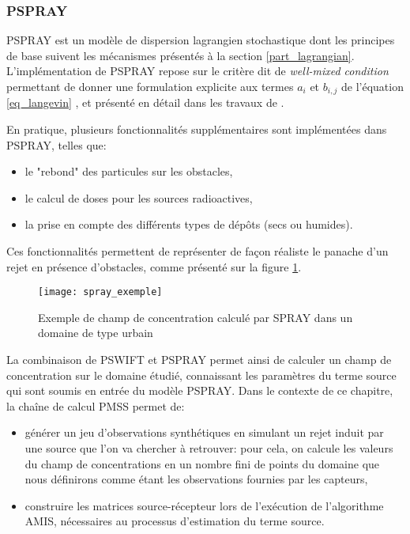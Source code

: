 {
\subsubsection{PSPRAY}
}

{PSPRAY} est un modèle de dispersion lagrangien stochastique dont les principes de base suivent les mécanismes présentés à la section \ref{part_lagrangian}. L'implémentation de {PSPRAY} repose sur le critère dit de \textit{well-mixed condition} permettant de donner une formulation explicite aux termes $a_i$ et $b_{i,j}$ de l'équation \eqref{eq_langevin} , et présenté en détail dans les travaux de \cite{Thomson1987}.

En pratique, plusieurs fonctionnalités supplémentaires sont implémentées dans {PSPRAY}, telles que: \\

\begin{itemize}
	\item le "rebond" des particules sur les obstacles,
	\item le calcul de doses pour les sources radioactives,
	\item la prise en compte des différents types de dépôts (secs ou humides).\\
\end{itemize}

{Ces fonctionnalités permettent de représenter de façon réaliste le panache d'un rejet en présence d'obstacles, comme présenté sur la figure \ref{fig_spray_exemple}.}

\begin{figure}[h!]
	\centering
	\texttt{[image: spray\_exemple]}
	\caption{Exemple de champ de concentration calculé par SPRAY dans un domaine de type urbain}
	\label{fig_spray_exemple}
\end{figure}

La combinaison de {PSWIFT} et {PSPRAY} permet ainsi de calculer un champ de concentration sur le domaine étudié, connaissant les paramètres du terme source qui sont soumis en entrée du modèle {PSPRAY}. Dans le contexte de ce chapitre, la chaîne de calcul PMSS permet de:

\begin{itemize}
	\item générer un jeu d'observations synthétiques en simulant un rejet induit par une source que l'on va chercher à retrouver: pour cela, on calcule les valeurs du champ de concentrations en un nombre fini de points du domaine que nous définirons comme étant les observations fournies par les capteurs,
	\item construire les matrices source-récepteur lors de l'exécution de l'algorithme AMIS, nécessaires au processus d'estimation du terme source.\\
\end{itemize}

